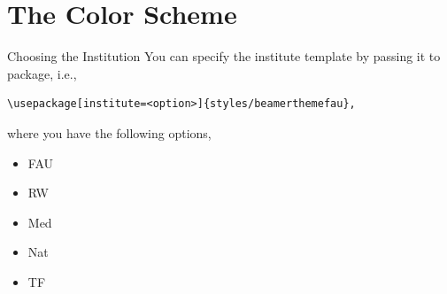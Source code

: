 \documentclass[final]{beamer}
\begin{document}
\section{The Color Scheme}
%
%
%
%
%
\begin{frame}[fragile]{Choosing the Institution}
  You can specify the institute template by passing it to package, i.e.,
  \begin{center}
\begin{verbatim}
\usepackage[institute=<option>]{styles/beamerthemefau},
\end{verbatim}
  \end{center}
  where you have the following options,
  \begin{itemize}
    \item FAU
    \item RW
    \item Med
    \item Nat
    \item TF
  \end{itemize}
\end{frame}
%
%
%
%
%
\end{document}
